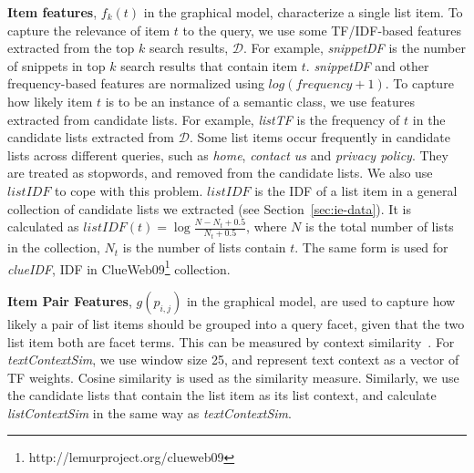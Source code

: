 \textbf{Item features}, $f_k(t)$ in the graphical model, characterize a single list item.
To capture the relevance of item $t$ to the query, 
we use some TF/IDF-based features extracted from the top $k$ search results, $\mathcal{D}$.
For example, \textit{snippetDF} is the number of snippets in top $k$ search results that contain item $t$.
\textit{snippetDF} and other frequency-based features are normalized using $log(frequency+1)$.
To capture how likely item $t$ is to be an instance of a semantic class, we use features extracted from candidate lists.
For example, \textit{listTF} is the frequency of $t$ in the candidate lists extracted from $\mathcal{D}$.
Some list items occur frequently in candidate lists across different queries, such as 
\textit{home}, \textit{contact us} and \textit{privacy policy}. They are treated as stopwords, and removed from the candidate lists.
We also use $listIDF$ to cope with this problem. 
$listIDF$ is the IDF of a list item in a general collection of candidate lists we extracted (see Section~\ref{sec:ie-data}).
It is calculated as $listIDF(t)=\log{\frac{N-N_{t}+0.5}{N_t+0.5}}$, where $N$ is the total number of lists in the collection, 
$N_t$ is the number of lists contain $t$.
The same form is used for \textit{clueIDF}, IDF in ClueWeb09\footnote{http://lemurproject.org/clueweb09} collection.

\textbf{Item Pair Features}, $g(p_{i,j})$ in the graphical model, 
are used to capture how likely a pair of list items should be grouped into a query facet,
given that the two list item both are facet terms.
This can be measured by context similarity~\cite{shi2010corpus}.
For \textit{textContextSim}, we use window size 25, and represent text context as a vector of TF weights.
Cosine similarity is used as the similarity measure.
Similarly, we use the candidate lists that contain the list item as its list context, and calculate \textit{listContextSim}
in the same way as \textit{textContextSim}.

